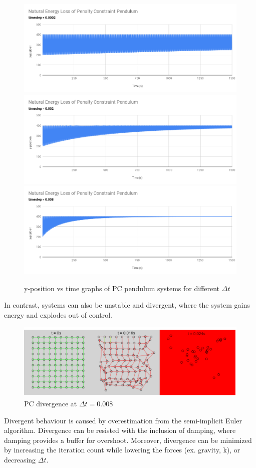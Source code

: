 \documentclass[12pt, letterpaper]{article}
\begin{document}
\begin{figure}[H]
\centering
\includegraphics[width=16cm]{pc pendulum 2.png}
\includegraphics[width = 16cm]{pc pendulum 1.png}
\includegraphics[width = 16cm]{pc pendulum 3.png}
\caption{y-position vs time graphs of PC pendulum systems for different $\Delta t$}
\label{fig:figure}
\end{figure} 
\clearpage
In contrast, systems can also be unstable and divergent, where the system gains energy and explodes out of control. 
\begin{figure}[H]
\centering
\includegraphics[width=13cm]{pc diverge dt = .008.png}
\caption{PC divergence at $\Delta t = 0.008$}
\label{fig:figure}
\end{figure} 
\noindent Divergent behaviour is caused by overestimation from the semi-implicit Euler algorithm. Divergence can be resisted with the inclusion of damping, where damping provides a buffer for overshoot. Moreover, divergence can be minimized by increasing the iteration count while lowering the forces (ex. gravity, k), or decreasing $\Delta t$.
\end{document}
